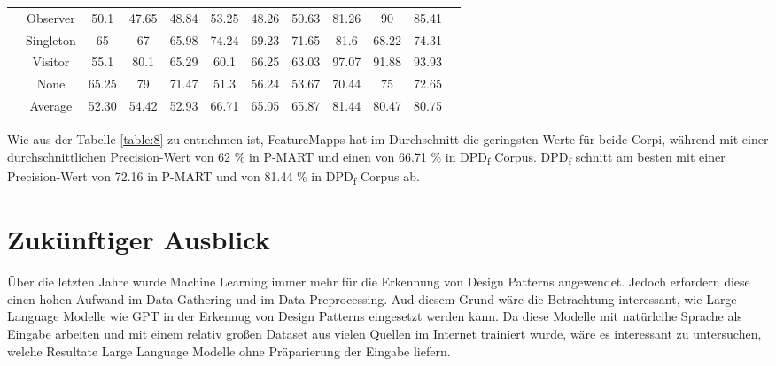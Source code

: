 \documentclass[conference]{IEEEtran}
\begin{document}
\begin{table}
\begin{tabular}{|c|c|c|c|c|c|c|c|c|c|c|c|}
        & Observer & 50.1 & 47.65 & 48.84 & 53.25 & 48.26 & 50.63 & 81.26 & 90 & 85.41\\
        & Singleton & 65 & 67 & 65.98 & 74.24 & 69.23 & 71.65 & 81.6 & 68.22 & 74.31\\
        & Visitor & 55.1 & 80.1 & 65.29 & 60.1 & 66.25 & 63.03 & 97.07 & 91.88 & 93.93\\
        & None & 65.25 & 79 & 71.47 & 51.3 & 56.24 & 53.67 & 70.44 & 75 & 72.65\\
        \cline{2-11}
        & Average & 52.30 & 54.42 & 52.93 & 66.71 & 65.05 & 65.87 & 81.44 & 80.47 & 80.75\\
        \hline

    \end{tabular}
\end{table}

\newpage

Wie aus der Tabelle \ref{table:8} zu entnehmen ist, FeatureMapps hat im Durchschnitt die geringsten Werte für beide Corpi, während mit einer durchschnittlichen Precision-Wert von 62 \% in P-MART und einen von 66.71 \% in DPD\textsubscript{f} Corpus.
DPD\textsubscript{f} schnitt am besten mit einer Precision-Wert von 72.16 in P-MART und von 81.44 \% in DPD\textsubscript{f} Corpus ab.

\newpage

\section{Zukünftiger Ausblick}

Über die letzten Jahre wurde Machine Learning immer mehr für die Erkennung von Design Patterns angewendet. Jedoch erfordern diese einen hohen Aufwand im Data Gathering und im Data Preprocessing.
Aud diesem Grund wäre die Betrachtung interessant, wie Large Language Modelle wie GPT in der Erkennug von Design Patterns eingesetzt werden kann. Da diese Modelle mit natürlcihe Sprache als Eingabe arbeiten und mit einem relativ großen Dataset aus vielen Quellen im Internet trainiert wurde,
wäre es interessant zu untersuchen, welche Resultate Large Language Modelle ohne Präparierung der Eingabe liefern.

\newpage


\end{document}
